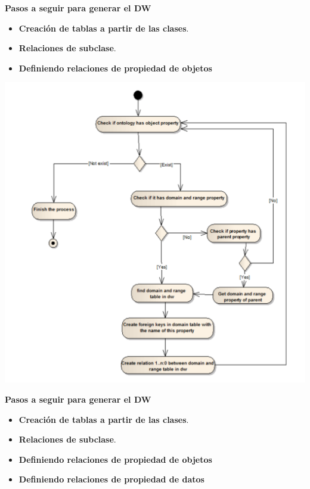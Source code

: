 \documentclass{fancyslides}
\begin{document}
\begin{frame}
\misc
{ \textbf{\Large Pasos a seguir para generar el DW}
\newline
\newline

\begin{itemize}
  \item \textbf{Creación de tablas a partir de las clases}.
  \item \textbf{Relaciones de subclase}.
  \item \textbf{Definiendo relaciones de propiedad de objetos}
\end{itemize}

}
\end{frame}

\begin{frame}
\misc
{
\begin{center}
\includegraphics[scale=0.18]{object_property}
\end{center}
}
\end{frame}


\begin{frame}
\misc
{ \textbf{\Large Pasos a seguir para generar el DW}
\newline
\newline

\begin{itemize}
  \item \textbf{Creación de tablas a partir de las clases}.
  \item \textbf{Relaciones de subclase}.
  \item \textbf{Definiendo relaciones de propiedad de objetos}
  \item \textbf{Definiendo relaciones de propiedad de datos}
\end{itemize}

}
\end{frame}
\end{document}
